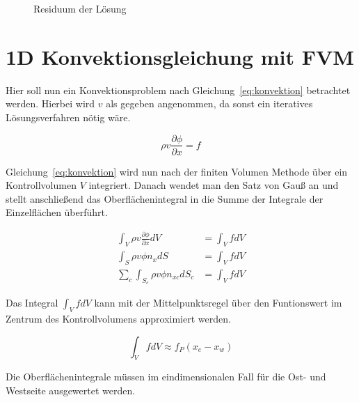 \documentclass[10pt, ngerman,colorback,accentcolor=tud2d]{tudreport}
\begin{document}
\begin{figure}
\caption{Residuum der Lösung}
\end{figure}


\chapter{1D Konvektionsgleichung mit FVM}
\label{chap:1D Konvektionsgleichung mit FVM}

Hier soll nun ein Konvektionsproblem nach Gleichung~\ref{eq:konvektion} betrachtet
werden. Hierbei wird $v$ als gegeben angenommen, da sonst ein iteratives
Lösungsverfahren nötig wäre.

\begin{equation}
  \rho v \frac{\partial \phi}{\partial x} = f
  \label{eq:konvektion}
\end{equation}

Gleichung~\ref{eq:konvektion} wird nun nach der finiten Volumen Methode über ein
Kontrollvolumen $V$ integriert. Danach wendet man den Satz von Gauß an und stellt
anschließend das Oberflächenintegral in die Summe der Integrale der Einzelflächen
überführt.

\begin{align}
  \int_V \rho v \frac{\partial \phi}{\partial x} dV &= \int_V f dV \nonumber \\
  \int_S \rho v \phi n_x dS &=\int_V f dV \nonumber\\
  \sum_c \int_{S_c} \rho v \phi n_{xc} dS_c &=\int_V f dV \label{eq:base_conv_ready}
\end{align}

Das Integral $\int_V f dV$ kann mit der Mittelpunktsregel über den Funtionswert
im Zentrum des Kontrollvolumens approximiert werden.

\begin{equation}
  \int_V f dV \approx f_P (x_e-x_w) \label{eq:source_term}
\end{equation}

Die Oberflächenintegrale müssen im eindimensionalen Fall für die Ost- und Westseite
ausgewertet werden.
\end{document}
